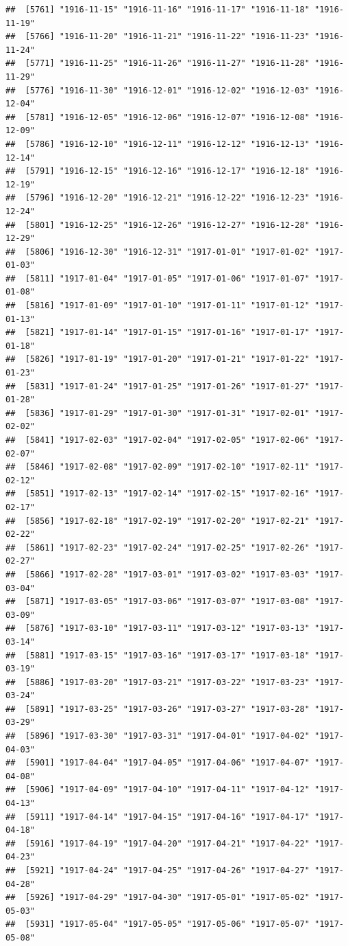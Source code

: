 \documentclass{article}\usepackage[]{graphicx}\usepackage[]{color}
\makeatletter
\newenvironment{kframe}{%
 \def\at@end@of@kframe{}%
 \ifinner\ifhmode%
  \def\at@end@of@kframe{\end{minipage}}%
  \begin{minipage}{\columnwidth}%
 \fi\fi%
 \def\FrameCommand##1{\hskip\@totalleftmargin \hskip-\fboxsep
 \colorbox{shadecolor}{##1}\hskip-\fboxsep
     \hskip-\linewidth \hskip-\@totalleftmargin \hskip\columnwidth}%
 \MakeFramed {\advance\hsize-\width
   \@totalleftmargin\z@ \linewidth\hsize
   \@setminipage}}%
 {\par\unskip\endMakeFramed%
 \at@end@of@kframe}
\newenvironment{knitrout}{}{} %
\makeatother
\begin{document}
\begin{description}
\begin{knitrout}
\begin{kframe}
\begin{verbatim}
##  [5761] "1916-11-15" "1916-11-16" "1916-11-17" "1916-11-18" "1916-11-19"
##  [5766] "1916-11-20" "1916-11-21" "1916-11-22" "1916-11-23" "1916-11-24"
##  [5771] "1916-11-25" "1916-11-26" "1916-11-27" "1916-11-28" "1916-11-29"
##  [5776] "1916-11-30" "1916-12-01" "1916-12-02" "1916-12-03" "1916-12-04"
##  [5781] "1916-12-05" "1916-12-06" "1916-12-07" "1916-12-08" "1916-12-09"
##  [5786] "1916-12-10" "1916-12-11" "1916-12-12" "1916-12-13" "1916-12-14"
##  [5791] "1916-12-15" "1916-12-16" "1916-12-17" "1916-12-18" "1916-12-19"
##  [5796] "1916-12-20" "1916-12-21" "1916-12-22" "1916-12-23" "1916-12-24"
##  [5801] "1916-12-25" "1916-12-26" "1916-12-27" "1916-12-28" "1916-12-29"
##  [5806] "1916-12-30" "1916-12-31" "1917-01-01" "1917-01-02" "1917-01-03"
##  [5811] "1917-01-04" "1917-01-05" "1917-01-06" "1917-01-07" "1917-01-08"
##  [5816] "1917-01-09" "1917-01-10" "1917-01-11" "1917-01-12" "1917-01-13"
##  [5821] "1917-01-14" "1917-01-15" "1917-01-16" "1917-01-17" "1917-01-18"
##  [5826] "1917-01-19" "1917-01-20" "1917-01-21" "1917-01-22" "1917-01-23"
##  [5831] "1917-01-24" "1917-01-25" "1917-01-26" "1917-01-27" "1917-01-28"
##  [5836] "1917-01-29" "1917-01-30" "1917-01-31" "1917-02-01" "1917-02-02"
##  [5841] "1917-02-03" "1917-02-04" "1917-02-05" "1917-02-06" "1917-02-07"
##  [5846] "1917-02-08" "1917-02-09" "1917-02-10" "1917-02-11" "1917-02-12"
##  [5851] "1917-02-13" "1917-02-14" "1917-02-15" "1917-02-16" "1917-02-17"
##  [5856] "1917-02-18" "1917-02-19" "1917-02-20" "1917-02-21" "1917-02-22"
##  [5861] "1917-02-23" "1917-02-24" "1917-02-25" "1917-02-26" "1917-02-27"
##  [5866] "1917-02-28" "1917-03-01" "1917-03-02" "1917-03-03" "1917-03-04"
##  [5871] "1917-03-05" "1917-03-06" "1917-03-07" "1917-03-08" "1917-03-09"
##  [5876] "1917-03-10" "1917-03-11" "1917-03-12" "1917-03-13" "1917-03-14"
##  [5881] "1917-03-15" "1917-03-16" "1917-03-17" "1917-03-18" "1917-03-19"
##  [5886] "1917-03-20" "1917-03-21" "1917-03-22" "1917-03-23" "1917-03-24"
##  [5891] "1917-03-25" "1917-03-26" "1917-03-27" "1917-03-28" "1917-03-29"
##  [5896] "1917-03-30" "1917-03-31" "1917-04-01" "1917-04-02" "1917-04-03"
##  [5901] "1917-04-04" "1917-04-05" "1917-04-06" "1917-04-07" "1917-04-08"
##  [5906] "1917-04-09" "1917-04-10" "1917-04-11" "1917-04-12" "1917-04-13"
##  [5911] "1917-04-14" "1917-04-15" "1917-04-16" "1917-04-17" "1917-04-18"
##  [5916] "1917-04-19" "1917-04-20" "1917-04-21" "1917-04-22" "1917-04-23"
##  [5921] "1917-04-24" "1917-04-25" "1917-04-26" "1917-04-27" "1917-04-28"
##  [5926] "1917-04-29" "1917-04-30" "1917-05-01" "1917-05-02" "1917-05-03"
##  [5931] "1917-05-04" "1917-05-05" "1917-05-06" "1917-05-07" "1917-05-08"

\end{verbatim}
\end{kframe}
\end{knitrout}
\end{description}
\end{document}
